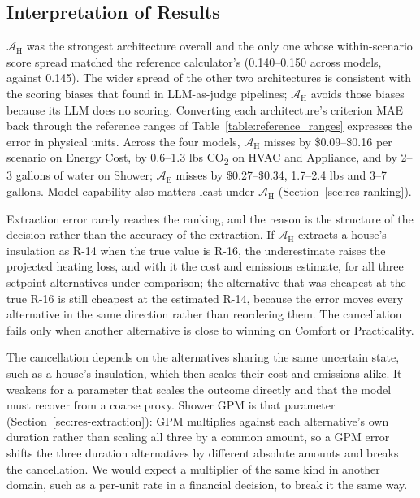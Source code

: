 \documentclass[final,3p,times]{elsarticle}
\begin{document}
\subsection{Interpretation of Results}
\label{sec:interpretation}
$\mathcal{A}_{\text{H}}$ was the strongest architecture overall and the only one whose within-scenario score spread matched the reference calculator's (0.140--0.150 across models, against 0.145). The wider spread of the other two architectures is consistent with the scoring biases that \citet{li2026scoringbias} found in LLM-as-judge pipelines; $\mathcal{A}_{\text{H}}$ avoids those biases because its LLM does no scoring. Converting each architecture's criterion MAE back through the reference ranges of Table~\ref{table:reference_ranges} expresses the error in physical units. Across the four models, $\mathcal{A}_{\text{H}}$ misses by \$0.09--\$0.16 per scenario on Energy Cost, by 0.6--1.3 lbs CO\textsubscript{2} on HVAC and Appliance, and by 2--3 gallons of water on Shower; $\mathcal{A}_{\text{E}}$ misses by \$0.27--\$0.34, 1.7--2.4 lbs and 3--7 gallons. Model capability also matters least under $\mathcal{A}_{\text{H}}$ (Section~\ref{sec:res-ranking}).

Extraction error rarely reaches the ranking, and the reason is the structure of the decision rather than the accuracy of the extraction. If $\mathcal{A}_{\text{H}}$ extracts a house's insulation as R-14 when the true value is R-16, the underestimate raises the projected heating loss, and with it the cost and emissions estimate, for all three setpoint alternatives under comparison; the alternative that was cheapest at the true R-16 is still cheapest at the estimated R-14, because the error moves every alternative in the same direction rather than reordering them. The cancellation fails only when another alternative is close to winning on Comfort or Practicality.

The cancellation depends on the alternatives sharing the same uncertain state, such as a house's insulation, which then scales their cost and emissions alike. It weakens for a parameter that scales the outcome directly and that the model must recover from a coarse proxy. Shower GPM is that parameter (Section~\ref{sec:res-extraction}): GPM multiplies against each alternative's own duration rather than scaling all three by a common amount, so a GPM error shifts the three duration alternatives by different absolute amounts and breaks the cancellation. We would expect a multiplier of the same kind in another domain, such as a per-unit rate in a financial decision, to break it the same way.
\end{document}
